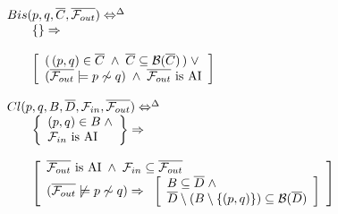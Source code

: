 \begin{figure}
\begingroup\footnotesize
\[
\begin{array}{lll}
\multicolumn{3}{l}{Bis(p,q,\overline{C},\overline{{\cal F}_{out}}) \Leftrightarrow^{\Delta}}\\
&&\left\{\right\}\Rightarrow\\
\\
&&\left[
\begin{array}{l}
(\,(p,q)\in \overline{C}\;\wedge\; \overline{C}\subseteq{\cal B}(\overline{C})\,) \;\vee\\
(\overline{{\cal F}_{out}}\models p\not\sim q)\;\wedge\;\overline{{\cal F}_{out}}  \mbox{ is AI}
\end{array}
\right]\\
\\

\multicolumn{3}{l}{Cl(p,q,B,\overline{D},{\cal F}_{in},\overline{{\cal F}_{out}}) \Leftrightarrow^{\Delta}}\\
&&\left\{
\begin{array}{l}
(p,q)\in B \;\wedge\\
{\cal F}_{in} \mbox{ is AI}
\end{array}
\right\}\Rightarrow\\
\\
&&\left[
\begin{array}{l}
\overline{{\cal F}_{out}}  \mbox{ is AI} \;\wedge\;{\cal F}_{in}\subseteq\overline{{\cal F}_{out}}\\
(\overline{{\cal F}_{out}}\not\models p\not\sim q)\Rightarrow\;\;
\left[
\begin{array}{l}
B\subseteq \overline{D}\; \wedge\\
\overline{D}\setminus (B\setminus \{(p,q)\})\subseteq {\cal B}(\overline{D})
\end{array}
\right]
\end{array}
\right]\\
\\


\end{array}\]
\end{figure}
